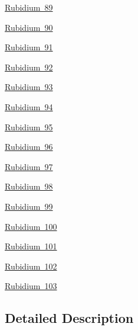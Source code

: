 \begin{DoxyCompactItemize}
\item 
\mbox{\hyperlink{group___isotope_const-_rubidium-_rb89}{Rubidium 89}}
\item 
\mbox{\hyperlink{group___isotope_const-_rubidium-_rb90}{Rubidium 90}}
\item 
\mbox{\hyperlink{group___isotope_const-_rubidium-_rb91}{Rubidium 91}}
\item 
\mbox{\hyperlink{group___isotope_const-_rubidium-_rb92}{Rubidium 92}}
\item 
\mbox{\hyperlink{group___isotope_const-_rubidium-_rb93}{Rubidium 93}}
\item 
\mbox{\hyperlink{group___isotope_const-_rubidium-_rb94}{Rubidium 94}}
\item 
\mbox{\hyperlink{group___isotope_const-_rubidium-_rb95}{Rubidium 95}}
\item 
\mbox{\hyperlink{group___isotope_const-_rubidium-_rb96}{Rubidium 96}}
\item 
\mbox{\hyperlink{group___isotope_const-_rubidium-_rb97}{Rubidium 97}}
\item 
\mbox{\hyperlink{group___isotope_const-_rubidium-_rb98}{Rubidium 98}}
\item 
\mbox{\hyperlink{group___isotope_const-_rubidium-_rb99}{Rubidium 99}}
\item 
\mbox{\hyperlink{group___isotope_const-_rubidium-_rb100}{Rubidium 100}}
\item 
\mbox{\hyperlink{group___isotope_const-_rubidium-_rb101}{Rubidium 101}}
\item 
\mbox{\hyperlink{group___isotope_const-_rubidium-_rb102}{Rubidium 102}}
\item 
\mbox{\hyperlink{group___isotope_const-_rubidium-_rb103}{Rubidium 103}}
\end{DoxyCompactItemize}


\subsection{Detailed Description}
